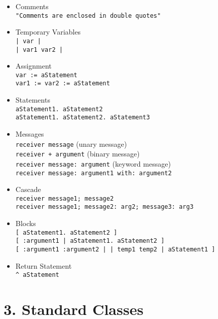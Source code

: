 \documentclass[8pt,a4paper]{leaflet}
\newcommand{\ct}{\lstinline[mathescape=false,basicstyle={\sffamily\upshape}]}
\begin{document}
\begin{itemize}
	\item{Comments} \\
	\ct{"Comments are enclosed in double quotes"}
	
	\item{Temporary Variables}  \\
	\ct{| var |} \\
	\ct{| var1 var2 |}
	
	\item{Assignment} \\
	\ct{var := aStatement} \\
	\ct{var1 := var2 := aStatement}
	
	\item{Statements} \\
	\ct{aStatement1. aStatement2} \\
	\ct{aStatement1. aStatement2. aStatement3}
	
	\item{Messages} \\
	\ct{receiver message} (unary message) \\
	\ct{receiver + argument} (binary message) \\
	\ct{receiver message: argument} (keyword message) \\
	\ct{receiver message: argument1 with: argument2}
	
	\item{Cascade} \\
	\ct{receiver message1; message2} \\
	\ct{receiver message1; message2: arg2; message3: arg3}	
	
	\item{Blocks} \\
	\ct{[ aStatement1. aStatement2 ]} \\
	\ct{[ :argument1 | aStatement1. aStatement2 ]} \\
	\ct{[ :argument1 :argument2 | | temp1 temp2 | aStatement1 ]}
	
	\item{Return Statement} \\
	\ct{^ aStatement}
	
\end{itemize}


\section{3. Standard Classes}
\end{document}
